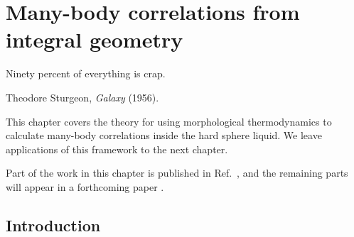 \documentclass[11pt,twoside]{report}
\begin{document}
\chapter{Many-body correlations from integral geometry}
\epigraph{Ninety percent of everything is crap.}{Theodore Sturgeon, \emph{Galaxy} (1956).}
\label{chapter:morphometric-framework}


This chapter covers the theory for using morphological thermodynamics to calculate many-body correlations inside the hard sphere liquid.
We leave applications of this framework to the next chapter.

Part of the work in this chapter is published in Ref.\ \cite{RobinsonPRL2019}, and the remaining parts will appear in a forthcoming paper \cite{RobinsonJSTAT2019}.

\section{Introduction}
\end{document}
